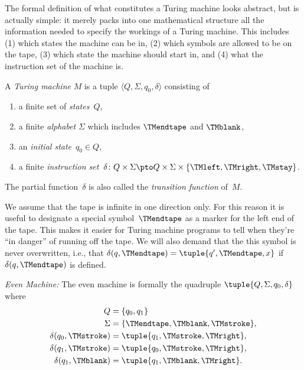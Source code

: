 \documentclass[../../../include/open-logic-section]{subfiles}
\begin{document}

\begin{explain}
The formal definition of what constitutes a Turing machine looks
abstract, but is actually simple: it merely packs into one
mathematical structure all the information needed to specify the
workings of a Turing machine. This includes (1) which states the
machine can be in, (2) which symbols are allowed to be on the tape, (3)
which state the machine should start in, and (4) what the instruction
set of the machine is.
\end{explain}

\begin{defn}
A \emph{Turing machine} $M$ is a tuple $\langle Q, \Sigma, q_0,
\delta\rangle$ consisting of
\begin{enumerate}
\item a finite set of \emph{states}~$Q$,
\item a finite \emph{alphabet} $\Sigma$ which includes $\TMendtape$ and
  $\TMblank$,
\item an \emph{initial state}~$q_0 \in Q$,
\item a finite \emph{instruction set}~$\delta\colon Q \times \Sigma
  \pto Q \times \Sigma \times \{\TMleft, \TMright, \TMstay\}$.
\end{enumerate}
The partial function~$\delta$ is also called the \emph{transition function}
of~$M$.
\end{defn}


\begin{explain}
We assume that the tape is infinite in one direction only. For this
reason it is useful to designate a special symbol~$\TMendtape$ as
a marker for the left end of the tape. This makes it easier for
Turing machine programs to tell when they're ``in danger'' of running
off the tape. We will also demand that the this symbol is never overwritten,
i.e., that $\delta(q,\TMendtape) = \tuple{q', \TMendtape, x}$ if
$\delta(q,\TMendtape)$ is defined.
\end{explain}

\begin{ex}
\emph{Even Machine:} The even machine is formally
the quadruple $\tuple{Q, \Sigma, q_0, \delta}$ where
\begin{align*}
Q & = \{ q_0, q_1 \} \\
\Sigma & = \{ \TMendtape, \TMblank, \TMstroke \}, \\
\delta(q_0, \TMstroke) & = \tuple{q_1, \TMstroke, \TMright},\\
\delta(q_1, \TMstroke) & = \tuple{q_0, \TMstroke, \TMright},\\
\delta(q_1, \TMblank)  & = \tuple{q_1, \TMblank, \TMright}.
\end{align*}
\end{ex}
\end{document}
